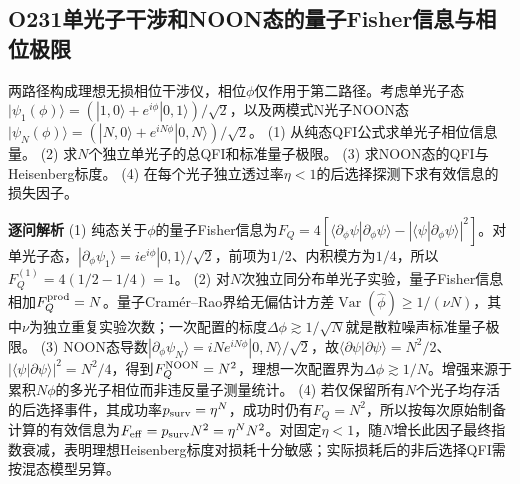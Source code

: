 \subsection*{O231\quad 单光子干涉和NOON态的量子Fisher信息与相位极限}
两路径构成理想无损相位干涉仪，相位$\phi$仅作用于第二路径。考虑单光子态$|\psi_1(\phi)\rangle=(|1,0\rangle+e^{i\phi}|0,1\rangle)/\sqrt2$，以及两模式N光子NOON态$|\psi_N(\phi)\rangle=(|N,0\rangle+e^{iN\phi}|0,N\rangle)/\sqrt2$。
(1) 从纯态QFI公式求单光子相位信息量。
(2) 求$N$个独立单光子的总QFI和标准量子极限。
(3) 求NOON态的QFI与Heisenberg标度。
(4) 在每个光子独立透过率$\eta<1$的后选择探测下求有效信息的损失因子。
\par\textbf{逐问解析}
(1) 纯态关于$\phi$的量子Fisher信息为$F_Q=4[\langle\partial_\phi\psi|\partial_\phi\psi\rangle-|\langle\psi|\partial_\phi\psi\rangle|^2]$。对单光子态，$|\partial_\phi\psi_1\rangle=ie^{i\phi}|0,1\rangle/\sqrt2$，前项为$1/2$、内积模方为$1/4$，所以$F_Q^{(1)}=4(1/2-1/4)=1$。
(2) 对$N$次独立同分布单光子实验，量子Fisher信息相加$F_Q^{\rm prod}=N$。量子Cramér–Rao界给无偏估计方差$\operatorname{Var}(\hat\phi)\ge1/(\nu N)$，其中$\nu$为独立重复实验次数；一次配置的标度$\Delta\phi\gtrsim1/\sqrt N$就是散粒噪声标准量子极限。
(3) NOON态导数$|\partial_\phi\psi_N\rangle=iNe^{iN\phi}|0,N\rangle/\sqrt2$，故$\langle\partial\psi|\partial\psi\rangle=N^2/2$、$|\langle\psi|\partial\psi\rangle|^2=N^2/4$，得到$F_Q^{\rm NOON}=N^2$，理想一次配置界为$\Delta\phi\gtrsim1/N$。增强来源于累积$N\phi$的多光子相位而非违反量子测量统计。
(4) 若仅保留所有$N$个光子均存活的后选择事件，其成功率$p_{\rm surv}=\eta^N$，成功时仍有$F_Q=N^2$，所以按每次原始制备计算的有效信息为$F_{\rm eff}=p_{\rm surv}N^2=\eta^N N^2$。对固定$\eta<1$，随$N$增长此因子最终指数衰减，表明理想Heisenberg标度对损耗十分敏感；实际损耗后的非后选择QFI需按混态模型另算。
\par\medskip
